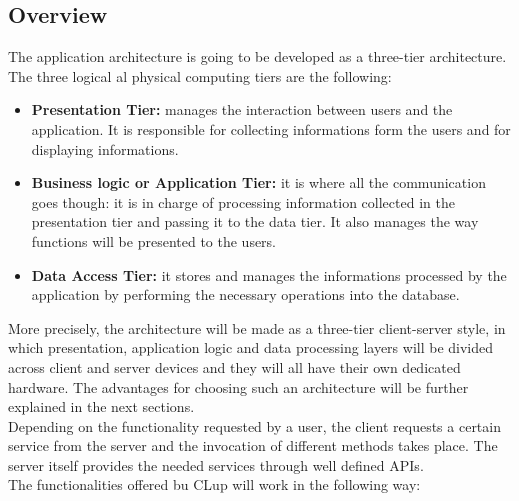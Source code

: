 \documentclass{article}
\begin{document}
\subsection{Overview}
The application architecture is going to be developed as a three-tier architecture. The three logical al physical computing tiers are the following:
\begin{itemize}
\item\textbf{Presentation Tier:} manages the interaction between users and the application. It is responsible for collecting informations form the users and for displaying informations.
\item\textbf{Business logic or Application Tier:} it is where all the communication goes though: it is in charge of processing information collected in the presentation tier and passing it to the data tier. It also manages the way functions will be presented to the users.
\item\textbf{Data Access Tier:} it stores and manages the informations processed by the application by performing the necessary operations into the database.
\end{itemize}
More precisely, the architecture will be made as a three-tier client-server style, in which presentation, application logic and data processing layers will be divided across client and server devices and they will all have their own dedicated hardware. The advantages for choosing such an architecture will be further explained in the next sections.
\smallskip\\
Depending on the functionality requested by a user, the client requests a certain service from the server and the invocation of different methods takes place. The server itself provides the needed services through well defined APIs.
\smallskip\\
The functionalities offered bu CLup will work in the following way:
\end{document}
